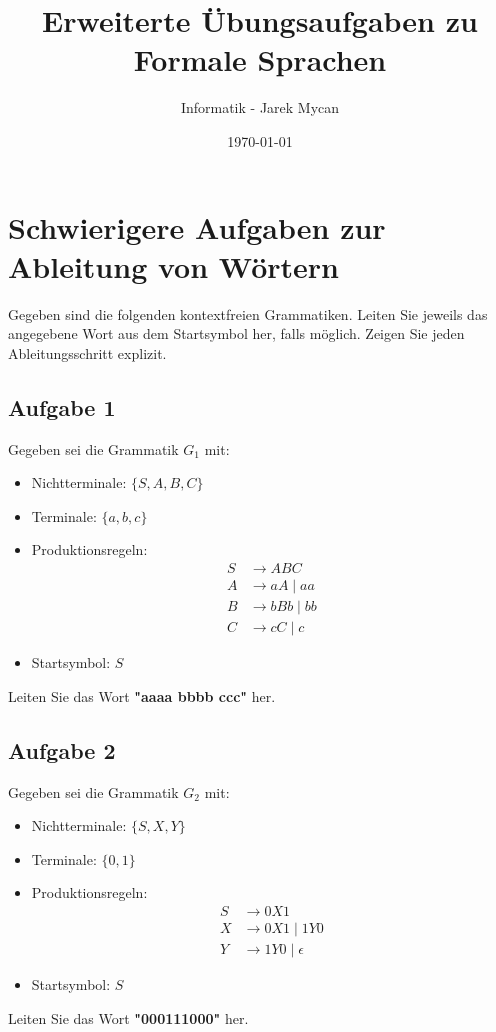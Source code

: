 \documentclass[a4paper,12pt]{article}
\begin{document}
	
	\title{Erweiterte Übungsaufgaben zu Formale Sprachen}
	\author{Informatik - Jarek Mycan}
	\date{\today}
	\maketitle
	
	\section*{Schwierigere Aufgaben zur Ableitung von Wörtern}
	
	Gegeben sind die folgenden kontextfreien Grammatiken. Leiten Sie jeweils das angegebene Wort aus dem Startsymbol her, falls möglich. Zeigen Sie jeden Ableitungsschritt explizit.
	
	\subsection*{Aufgabe 1}
	Gegeben sei die Grammatik $G_1$ mit:
	\begin{itemize}
		\item Nichtterminale: $\{S, A, B, C\}$
		\item Terminale: $\{a, b, c\}$
		\item Produktionsregeln:
		\begin{align*}
			S &\rightarrow A B C \\
			A &\rightarrow a A \mid a a \\
			B &\rightarrow b B b \mid b b \\
			C &\rightarrow c C \mid c
		\end{align*}
		\item Startsymbol: $S$
	\end{itemize}
	Leiten Sie das Wort \textbf{"aaaa bbbb ccc"} her.
	
	\subsection*{Aufgabe 2}
	Gegeben sei die Grammatik $G_2$ mit:
	\begin{itemize}
		\item Nichtterminale: $\{S, X, Y\}$
		\item Terminale: $\{0, 1\}$
		\item Produktionsregeln:
		\begin{align*}
			S &\rightarrow 0 X 1 \\
			X &\rightarrow 0 X 1 \mid 1 Y 0 \\
			Y &\rightarrow 1 Y 0 \mid \epsilon
		\end{align*}
		\item Startsymbol: $S$
	\end{itemize}
	Leiten Sie das Wort \textbf{"000111000"} her.
	
\end{document}
